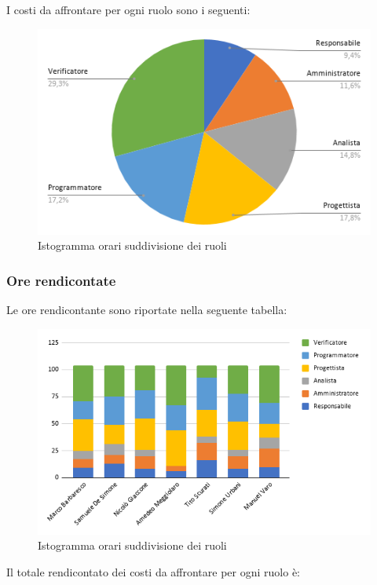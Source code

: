         I costi da affrontare per ogni ruolo sono i seguenti:
        \begin{figure}[!h]
            \caption{Istogramma orari suddivisione dei ruoli}
            \vspace{5px}
            \includegraphics[scale=0.5]{../../../Images/Diagrammi/Diagramma a torta/ore totali.png}
            \centering
        \end{figure}
    \subsubsection{Ore rendicontate}
        Le ore rendicontante sono riportate nella seguente tabella:

        \begin{figure}[!h]
            \caption{Istogramma orari suddivisione dei ruoli}
            \vspace{5px}
            \includegraphics[scale=0.6]{../../../Images/Diagrammi/Istogrammi/ore rendicontate.png}
            \centering
        \end{figure}
        Il totale rendicontato dei costi da affrontare per ogni ruolo è:

